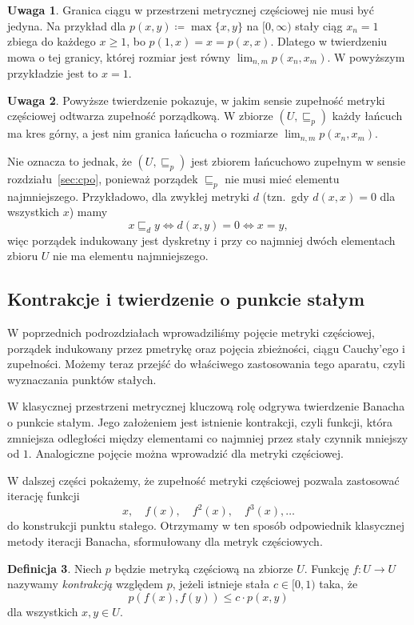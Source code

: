 \documentclass[11pt,a4paper]{article}
\theoremstyle{definition}
\newtheorem{definicja}{Definicja}[section]
\newtheorem{uwaga}[definicja]{Uwaga}
\theoremstyle{plain}
\begin{document}
\begin{uwaga}
	Granica ciągu w przestrzeni metrycznej częściowej nie musi być
	jedyna. Na przykład dla $p(x,y)\coloneqq\max\{x,y\}$ na $[0,\infty)$
	stały ciąg $x_n=1$ zbiega do każdego $x\geq1$, bo
	$p(1,x)=x=p(x,x)$. Dlatego w twierdzeniu mowa o tej granicy, której
	rozmiar jest równy $\lim_{n,m}p(x_n,x_m)$. W powyższym przykładzie jest
	to $x=1$.
\end{uwaga}

\begin{uwaga}
	Powyższe twierdzenie pokazuje, w jakim sensie zupełność metryki
	częściowej odtwarza zupełność porządkową. W zbiorze $(U,\sqsubseteq_p)$
	każdy łańcuch ma kres górny, a jest nim granica łańcucha o rozmiarze
	$\lim_{n,m}p(x_n,x_m)$.
	
	Nie oznacza to jednak, że $(U,\sqsubseteq_p)$ jest zbiorem łańcuchowo
	zupełnym w sensie rozdziału~\ref{sec:cpo},
	ponieważ porządek $\sqsubseteq_p$ nie musi mieć elementu najmniejszego.
	Przykładowo, dla zwykłej metryki $d$ (tzn.\ gdy $d(x,x)=0$ dla
	wszystkich $x$) mamy
	\[
	x\sqsubseteq_d y
	\iff
	d(x,y)=0
	\iff
	x=y,
	\]
	więc porządek indukowany jest dyskretny i przy co najmniej dwóch
	elementach zbioru $U$ nie ma elementu najmniejszego.
\end{uwaga}

\subsection{Kontrakcje i twierdzenie o punkcie stałym}

W poprzednich podrozdziałach wprowadziliśmy pojęcie metryki częściowej,
porządek indukowany przez pmetrykę oraz pojęcia zbieżności, ciągu
Cauchy'ego i zupełności. Możemy teraz przejść do właściwego zastosowania
tego aparatu, czyli wyznaczania punktów stałych.

W klasycznej przestrzeni metrycznej kluczową rolę odgrywa twierdzenie
Banacha o punkcie stałym. Jego założeniem jest istnienie kontrakcji, czyli
funkcji, która zmniejsza odległości między elementami co najmniej przez
stały czynnik mniejszy od $1$. Analogiczne pojęcie można wprowadzić dla
metryki częściowej.

W dalszej części pokażemy, że zupełność metryki częściowej pozwala
zastosować iterację funkcji
\[
x,\quad f(x),\quad f^2(x),\quad f^3(x),\ldots
\]
do konstrukcji punktu stałego. Otrzymamy w ten sposób odpowiednik
klasycznej metody iteracji Banacha, sformułowany dla metryk częściowych.

\begin{definicja}\label{def:kontrakcja_pmetryka}
	Niech $p$ będzie metryką częściową na zbiorze $U$. Funkcję
	$f:U\to U$ nazywamy \emph{kontrakcją} względem $p$, jeżeli istnieje
	stała $c\in[0,1)$ taka, że
	\[
	p(f(x),f(y))\leq c \cdot p(x,y)
	\]
	dla wszystkich $x,y\in U$.
\end{definicja}
\end{document}
